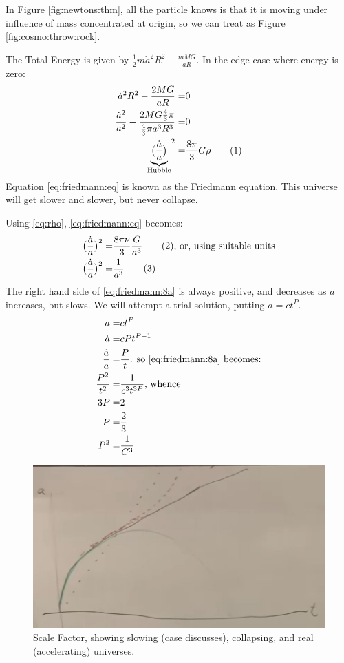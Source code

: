 \documentclass[]{article}
\newcommand\numberthis{\addtocounter{equation}{1}\tag{\theequation}}
\begin{document}
In Figure \ref{fig:newtons:thm}, all the particle knows is that it is moving under influence of mass concentrated at origin, so we can treat as Figure \ref{fig:cosmo:throw:rock}.

The Total Energy is given by $\frac{1}{2} m \dot{a}^2 R^2 -\frac{m M G}{a R}$. In the edge case where energy is zero:
\begin{align*}
	 \dot{a}^2 R^2 -\frac{2 M G}{a R} =& 0 \\
	 \frac{\dot{a}^2 }{a^2} -\frac{2 M G \frac{4}{3} \pi}{\frac{4}{3} \pi a^3 R^3} =& 0 \\
	 {\underbrace{\big(\frac{\dot{a}}{a}\big)}_\text{Hubble}}^2 =& \frac{8 \pi}{3} G \rho \numberthis \label{eq:friedmann:eq}
\end{align*}
Equation \eqref{eq:friedmann:eq} is known as the Friedmann equation. This universe will get slower and slower, but never collapse.

Using \eqref{eq:rho}, \eqref{eq:friedmann:eq} becomes:
\begin{align*}
	\big(\frac{\dot{a}}{a}\big)^2 =& \frac{8 \pi \nu}{3}\frac{G}{a^3} \numberthis \label{eq:friedmann:8} \text{, or, using suitable units}\\
	\big(\frac{\dot{a}}{a}\big)^2 =& \frac{1}{a^3} \numberthis \label{eq:friedmann:8a}
\end{align*}
The right hand side of \eqref{eq:friedmann:8a} is always positive, and decreases as $a$ increases, but slows. We will attempt a trial solution, putting $a=ct^P$.
\begin{align*}
	a=&ct^P\\
	\dot{a}=&c P t^{P-1}\\
	\frac{\dot{a}}{a}=& \frac{P}{t} \text{. so \eqref{eq:friedmann:8a} becomes:}\\
	\frac{P^2}{t^2} =& \frac{1}{c^3 t^{3P}} \text{, whence}\\
	3P =& 2\\
	P =& \frac{2}{3}\\
	P^2 =& \frac{1}{C^3}
\end{align*}

\begin{figure}[H]
	\caption[Scale Factor]{Scale Factor, showing slowing (case discusses), collapsing, and real (accelerating) universes.}
	\includegraphics[width=\textwidth]{cosmo-1-scale-factor}
\end{figure}
\end{document}
